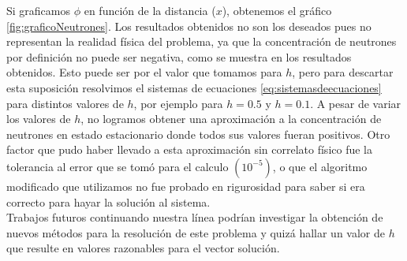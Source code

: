 \documentclass[11pt,a4paper]{emulateapj}
\begin{document}
Si graficamos $\phi$ en función de la distancia ($x$), obtenemos el gráfico \ref{fig:graficoNeutrones}. Los resultados obtenidos no son los deseados pues no representan la realidad física del problema, ya que la concentración de neutrones por definición no puede ser negativa, como se muestra en los resultados obtenidos. Esto puede ser por el valor que tomamos para $h$, pero para descartar esta suposición resolvimos el sistemas de ecuaciones \ref{eq:sistemasdeecuaciones} para distintos valores de $h$, por ejemplo para $h=0.5$ y $h=0.1$. A pesar de variar los valores de $h$, no logramos obtener una aproximación a la concentración de neutrones en estado estacionario donde todos sus valores fueran positivos.
Otro factor que pudo haber llevado a esta aproximación sin correlato físico fue la tolerancia al error que se tomó para el calculo $(10^{-5})$, o que el algoritmo modificado que utilizamos no fue probado en rigurosidad para saber si era correcto para hayar la solución al sistema. \\

Trabajos futuros continuando nuestra línea podrían investigar la obtención de nuevos métodos para la resolución de este problema y quizá hallar un valor de $h$ que resulte en valores razonables para el vector solución.

%
%

\end{document}
